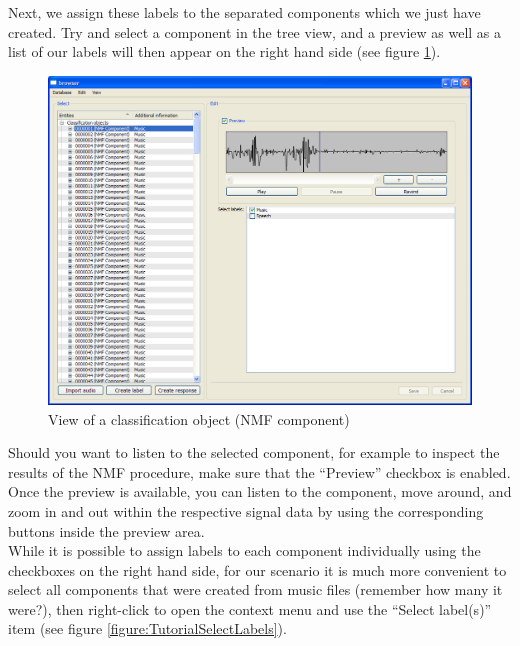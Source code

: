 Next, we assign these labels to the separated components which we just have
created. Try and select a component in the tree view, and a preview as well as a
list of our labels will then appear on the right hand side (see figure
\ref{figure:TutorialClassificationObjectView}).

\begin{figure}
    \centering
    \includegraphics[width=\textwidth]{tutorial-media/ClassificationObjectView.png}
    \caption{%
        \label{figure:TutorialClassificationObjectView}%
        View of a classification object (NMF component)
    }
\end{figure}

Should you want to listen to the selected component, for example to inspect the
results of the NMF procedure, make sure that the ``Preview'' checkbox is
enabled. Once the preview is available, you can listen to the component, move
around, and zoom in and out within the respective signal data by using the
corresponding buttons inside the preview area.\\

While it is possible to assign labels to each component individually using the
checkboxes on the right hand side, for our scenario it is much more convenient
to select all components that were created from music files (remember how many
it were?), then right-click to open the context menu and use the ``Select
label(s)'' item (see figure \ref{figure:TutorialSelectLabels}).

